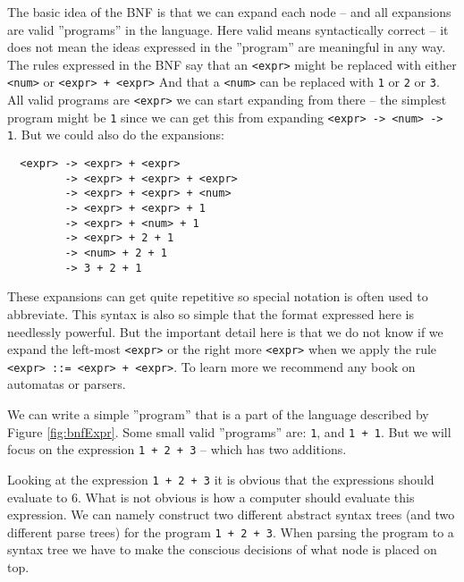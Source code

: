 The basic idea of the BNF is that we can expand each node -- and all expansions are valid ''programs'' in the language. Here valid means syntactically correct -- it does not mean the ideas expressed in the ''program'' are meaningful in any way. The rules expressed in the BNF say that an \verb|<expr>| might be replaced with either \verb|<num>| or \verb|<expr> + <expr>| And that a \verb|<num>| can be replaced with \verb|1| or \verb|2| or \verb|3|. All valid programs are \verb|<expr>| we can start expanding from there -- the simplest program might be \verb|1| since we can get this from expanding \verb|<expr> -> <num> -> 1|. But we could also do the expansions:
\begin{verbatim}
  <expr> -> <expr> + <expr>
         -> <expr> + <expr> + <expr>
         -> <expr> + <expr> + <num>
         -> <expr> + <expr> + 1
         -> <expr> + <num> + 1
         -> <expr> + 2 + 1
         -> <num> + 2 + 1
         -> 3 + 2 + 1
\end{verbatim}
These expansions can get quite repetitive so special notation is often used to abbreviate. This syntax is also so simple that the format expressed here is needlessly powerful. But the important detail here is that we do not know if we expand the left-most \verb|<expr>| or the right more \verb|<expr>| when we apply the rule \verb|<expr> ::= <expr> + <expr>|. To learn more we recommend any book on automatas or parsers. 

We can write a simple ''program'' that is a part of the language described by Figure \ref{fig:bnfExpr}. Some small valid ''programs'' are: \verb!1!, and \verb!1 + 1!. But we will focus on the expression \verb!1 + 2 + 3! -- which has two additions.

Looking at the expression \verb!1 + 2 + 3! it is obvious that the expressions should evaluate to 6. What is not obvious is how a computer should evaluate this expression. We can namely construct two different abstract syntax trees (and two different parse trees) for the program \verb!1 + 2 + 3!. When parsing the program to a syntax tree we have to make the conscious decisions of what node is placed on top.


